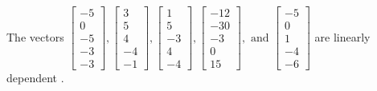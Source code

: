 \begin{exercise}
\begin{exerciseStatement}
  \end{exerciseStatement}
  \begin{exerciseAnswer}
   The vectors \(\left[\begin{array}{r}
-5 \\
0 \\
-5 \\
-3 \\
-3
\end{array}\right] , \left[\begin{array}{r}
3 \\
5 \\
4 \\
-4 \\
-1
\end{array}\right] , \left[\begin{array}{r}
1 \\
5 \\
-3 \\
4 \\
-4
\end{array}\right] , \left[\begin{array}{r}
-12 \\
-30 \\
-3 \\
0 \\
15
\end{array}\right] , \text{ and } \left[\begin{array}{r}
-5 \\
0 \\
1 \\
-4 \\
-6
\end{array}\right]\) are 
  	 linearly dependent  .
  


  \end{exerciseAnswer}
\end{exercise}